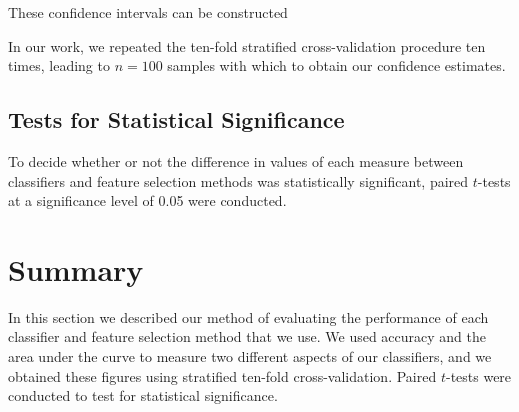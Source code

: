 These confidence intervals can be constructed 

In our work, we repeated the ten-fold stratified cross-validation procedure
ten times, leading to $n=100$ samples with which to obtain our confidence
estimates.

\subsection{Tests for Statistical Significance}
To decide whether or not the difference in values of each measure between
classifiers and feature selection methods was statistically significant,
paired $t$-tests at a significance level of 0.05 were conducted.

\section{Summary}
In this section we described our method of evaluating the performance of each
classifier and feature selection method that we use. We used accuracy and the
area under the curve to measure two different aspects of our classifiers, and
we obtained these figures using stratified ten-fold cross-validation. Paired
$t$-tests were conducted to test for statistical significance.
